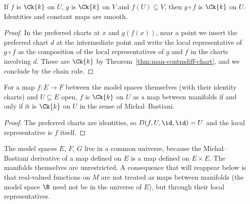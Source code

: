 \begin{theorem}[Composition]
  \label{thm:man-comp}
  \leanok
  If $f$ is $\Ck{k}$ on $U$, $g$ is $\Ck{k}$ on $V$ and $f(U) \subseteq V$, then $g \circ f$ is
  $\Ck{k}$ on $U$. Identities and constant maps are smooth.
\end{theorem}

\begin{proof}
  \leanok
  In the preferred charts at $x$ and $g(f(x))$, near a point we insert the preferred chart $d$ at
  the intermediate point and write the local representative of $g \circ f$ as the composition of
  the local representatives of $g$ and $f$ in the charts involving $d$. These are $\Ck{k}$ by
  Theorem~\ref{thm:man-contmdiff-chart}, and we conclude by the chain rule.
\end{proof}

\begin{proposition}
  \label{prop:man-consistency}
  \leanok
  For a map $f \colon E \to F$ between the model spaces themselves (with their identity charts)
  and $U \subseteq E$ open, $f$ is $\Ck{k}$ on $U$ as a map between manifolds if and only if it
  is $\Ck{k}$ on $U$ in the sense of Michal--Bastiani.
\end{proposition}

\begin{proof}
  \leanok
  The preferred charts are identities, so $D(f, U, \id, \id) = U$ and the local representative
  is $f$ itself.
\end{proof}

\begin{remark}[Universes]
  \label{rem:man-universes}
  The model spaces $E$, $F$, $G$ live in a common universe, because the Michal--Bastiani
  derivative of a map defined on $E$ is a map defined on $E \times E$. The manifolds themselves
  are unrestricted. A consequence that will reappear below is that real-valued functions on
  $M$ are not treated as maps between manifolds (the model space $\R$ need not be in the
  universe of $E$), but through their local representatives.
\end{remark}
